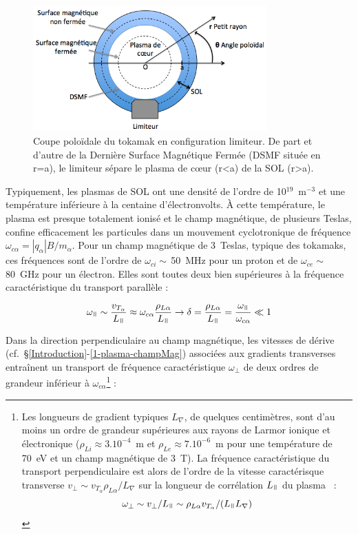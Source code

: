 \begin{refsection}
\begin{figure}[!htbp]
    \centering
	\includegraphics[width=0.8\textwidth]{figures/1-SOLLimiter.png}
	\caption{Coupe poloïdale du tokamak en configuration limiteur. De part et
	d'autre de la Dernière Surface Magnétique Fermée (DSMF située en r=a), le
	limiteur sépare le plasma de c\oe ur (r<a) de la SOL (r>a).}\label{SOL}
\end{figure}
 
Typiquement, les plasmas de SOL ont une densité de
l'ordre de 10$^{19}$~m$^{-3}$ et une température inférieure à la centaine
d'électronvolts. À cette température, le plasma est presque totalement ionisé et
le champ magnétique, de plusieurs Teslas, confine efficacement les particules
dans un mouvement cyclotronique de fréquence
$\omega_{c\alpha}=|q_\alpha|B/m_\alpha$. Pour un champ magnétique de 3~Teslas,
typique des tokamaks, ces fréquences sont de l'ordre de
$\omega_{ci}\sim\,$50~MHz pour un proton et de $\omega_{ce}\sim\,$80~GHz pour un électron.
Elles sont toutes deux bien supérieures à la fréquence caractéristique du
transport parallèle :

\begin{equation}
\omega_\para\sim
\frac{v_{{T}_\alpha}}{L_\para}\approx\omega_{c\alpha}\frac{\rho_{L\alpha}}{L_\para}\rightarrow
\delta=\frac{\rho_{L\alpha}}{L_\para}=\frac{\omega_\para}{\omega_{c\alpha}}\ll1
\end{equation} 

Dans la direction perpendiculaire au champ
magnétique, les vitesses de dérive
\mbox{(cf.~\S\ref{Introduction}-\ref{1-plasma-champMag})} associées aux
gradients transverses entraînent un
transport de fréquence caractéristique $\omega_\perp$ de deux
ordres de grandeur inférieur à $\omega_{c\alpha}$\footnote{Les longueurs de
gradient typiques $L_\nabla$, de quelques centimètres, sont d'au moins un ordre
de grandeur supérieures aux rayons de Larmor ionique et électronique ($\rho_{Li}\approx3.10^{-4}$~m et
$\rho_{Le}\approx7.10^{-6}$~m pour une température de 70~eV et un champ
magnétique de 3~T). La fréquence caractéristique du transport perpendiculaire
est alors de l'ordre de la vitesse caractérisque transverse $v_\perp\sim
v_{{T}_\alpha}\rho_{L\alpha}/L_\nabla$ sur la longueur de corrélation $L_\para$
du plasma~\parencite{SarazinPhD} : $$\omega_\perp\sim v_\perp/L_\para\sim\rho_{L\alpha} v_{{T}_\alpha}/(L_\para L_\nabla)$$} :


\end{refsection}
